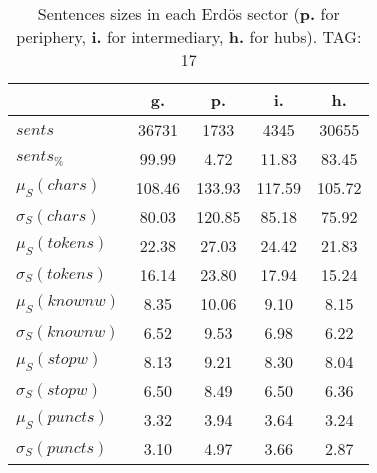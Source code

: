 \begin{table}[h!]
\begin{center}
\begin{tabular}{| l | c | c | c | c |}\hline
 & g. & p. & i. & h. \\\hline
$sents$ & 36731  & 1733  & 4345  & 30655 \\\hline
$sents_{\%}$ & 99.99  & 4.72  & 11.83  & 83.45 \\\hline
$\mu_S(chars)$ & 108.46  & 133.93  & 117.59  & 105.72 \\\hline
$\sigma_S(chars)$ & 80.03  & 120.85  & 85.18  & 75.92 \\\hline
$\mu_S(tokens)$ & 22.38  & 27.03  & 24.42  & 21.83 \\\hline
$\sigma_S(tokens)$ & 16.14  & 23.80  & 17.94  & 15.24 \\\hline
$\mu_S(knownw)$ & 8.35  & 10.06  & 9.10  & 8.15 \\\hline
$\sigma_S(knownw)$ & 6.52  & 9.53  & 6.98  & 6.22 \\\hline
$\mu_S(stopw)$ & 8.13  & 9.21  & 8.30  & 8.04 \\\hline
$\sigma_S(stopw)$ & 6.50  & 8.49  & 6.50  & 6.36 \\\hline
$\mu_S(puncts)$ & 3.32  & 3.94  & 3.64  & 3.24 \\\hline
$\sigma_S(puncts)$ & 3.10  & 4.97  & 3.66  & 2.87 \\\hline
\end{tabular}
\caption{Sentences sizes in each Erd\"os sector ({{\bf p.}} for periphery, {{\bf i.}} for intermediary, {{\bf h.}} for hubs). TAG: 17}
\end{center}
\end{table}